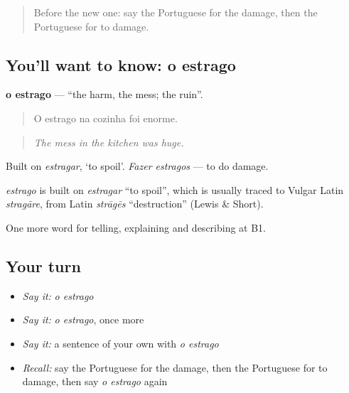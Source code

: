 \label{lesson:PT-C300-estrago}



\begin{quote}
Before the new one: say the Portuguese for the damage, then the Portuguese for to damage.
\end{quote}

\subsection*{You'll want to know: o estrago}
\textbf{o estrago} — \textquotedblleft{}the harm, the mess; the ruin\textquotedblright{}.

\begin{quote}
O estrago na cozinha foi enorme.
\end{quote}

\begin{quote}
\emph{The mess in the kitchen was huge.}
\end{quote}

Built on \emph{estragar}, ‘to spoil’. \emph{Fazer estragos} — to do damage.

\begin{cousinweb}
\emph{estrago} is built on \emph{estragar} \textquotedblleft{}to spoil\textquotedblright{}, which is usually traced to Vulgar Latin \emph{stragāre}, from Latin \emph{strāgēs} \textquotedblleft{}destruction\textquotedblright{} (Lewis \& Short).
\end{cousinweb}

\begin{grammarlens}[title={What you've built}]
One more word for telling, explaining and describing at B1.
\end{grammarlens}

\subsection*{Your turn}
\begin{itemize}
\raggedright
  \item \emph{Say it:} \emph{o estrago}
  \item \emph{Say it:} \emph{o estrago}, once more
  \item \emph{Say it:} a sentence of your own with \emph{o estrago}
  \item \emph{Recall:} say the Portuguese for the damage, then the Portuguese for to damage, then say \emph{o estrago} again
\end{itemize}

